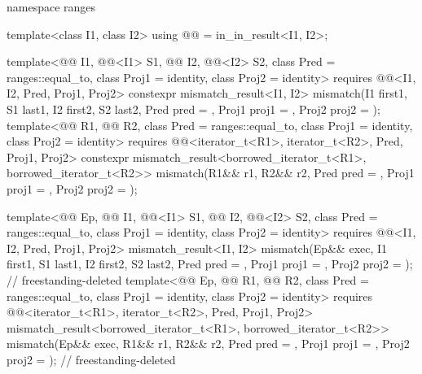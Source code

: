 \begin{codeblock}
{  namespace ranges {
    template<class I1, class I2>
      using @@ = in_in_result<I1, I2>;

    template<@@ I1, @@<I1> S1, @@ I2, @@<I2> S2,
             class Pred = ranges::equal_to, class Proj1 = identity, class Proj2 = identity>
      requires @@<I1, I2, Pred, Proj1, Proj2>
      constexpr mismatch_result<I1, I2>
        mismatch(I1 first1, S1 last1, I2 first2, S2 last2, Pred pred = {},
                 Proj1 proj1 = {}, Proj2 proj2 = {});
    template<@@ R1, @@ R2,
             class Pred = ranges::equal_to, class Proj1 = identity, class Proj2 = identity>
      requires @@<iterator_t<R1>, iterator_t<R2>, Pred, Proj1, Proj2>
      constexpr mismatch_result<borrowed_iterator_t<R1>, borrowed_iterator_t<R2>>
        mismatch(R1&& r1, R2&& r2, Pred pred = {},
                 Proj1 proj1 = {}, Proj2 proj2 = {});

    template<@@ Ep, @@ I1, @@<I1> S1,
             @@ I2, @@<I2> S2,
             class Pred = ranges::equal_to, class Proj1 = identity, class Proj2 = identity>
      requires @@<I1, I2, Pred, Proj1, Proj2>
      mismatch_result<I1, I2>
        mismatch(Ep&& exec, I1 first1, S1 last1, I2 first2, S2 last2, Pred pred = {},
                 Proj1 proj1 = {}, Proj2 proj2 = {});           // freestanding-deleted
    template<@@ Ep, @@ R1, @@ R2,
             class Pred = ranges::equal_to, class Proj1 = identity, class Proj2 = identity>
      requires @@<iterator_t<R1>, iterator_t<R2>, Pred, Proj1, Proj2>
      mismatch_result<borrowed_iterator_t<R1>, borrowed_iterator_t<R2>>
        mismatch(Ep&& exec, R1&& r1, R2&& r2, Pred pred = {},
                 Proj1 proj1 = {}, Proj2 proj2 = {});           // freestanding-deleted
  }

}
\end{codeblock}
